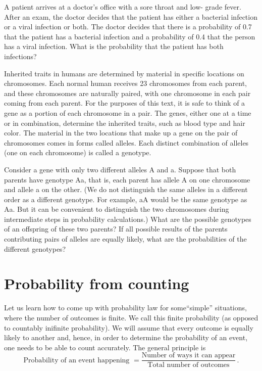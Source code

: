 \begin{example}
   A patient arrives at a doctor’s office with a sore throat and low- grade fever. After an exam, the doctor decides that the patient has either a bacterial infection or a viral infection or both. The doctor decides that there is a probability of 0.7 that the patient has a bacterial infection and a probability of 0.4 that the person has a viral infection. What is the probability that the patient has both infections? 
\end{example}

\begin{example}
    Inherited traits in humans are determined by material in specific locations
on chromosomes. Each normal human receives 23 chromosomes from each parent,
and these chromosomes are naturally paired, with one chromosome in each pair coming from each parent. For the purposes of this text, it is safe to think of a gene as a portion of each chromosome in a pair. The genes, either one at a time or in combination, determine the inherited traits, such as blood type and hair color. The material in the two locations that make up a gene on the pair of chromosomes comes in forms called alleles. Each distinct combination of alleles (one on each chromosome) is called a genotype.

Consider a gene with only two different alleles A and a. Suppose that both parents have genotype Aa, that is, each parent has allele A on one chromosome and allele a on the other. (We do not distinguish the same alleles in a different order as a different genotype. For example, aA would be the same genotype as Aa. But it can be convenient to distinguish the two chromosomes during intermediate steps in probability calculations.) What are the possible genotypes of an offspring of these two parents? If all possible results of the parents contributing pairs of alleles are equally likely, what are the probabilities of the different genotypes? 
\end{example}


\section{Probability from counting }
Let us learn how to come up with probability law for 
some``simple'' situations, where the number of outcomes is finite. 
We call this finite probability (as opposed to countably inifinite probability).
We will assume that every outcome is equally likely to another
and, hence, in order to determine the probability of an event, one needs to be
able to count accurately.
The general principle is
\begin{equation}
    \label{eq:gen-principle}
    \text{Probability of an event happening  }
    = \frac{\text{Number of ways it can appear}}{\text{Total number of  outcomes}} \,.
\end{equation}

